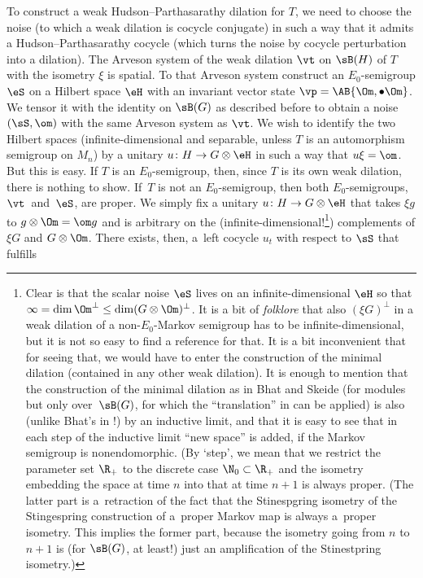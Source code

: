 To construct a weak Hudson--Parthasarathy dilation for $T$, we need to choose the noise (to which a weak dilation is cocycle conjugate) in such a way that it admits a Hudson--Parthasarathy cocycle (which turns the noise by cocycle perturbation into a dilation). The Arveson system of the weak dilation $\vt$ on $\sB(H)$ of $T$ with the isometry $\xi$ is spatial. To that Arveson system construct an $E_0$-semigroup $\eS$ on a Hilbert space $\eH$ with an invariant vector state $\vp=\AB{\Om,\bullet\Om}$. We tensor it with the identity on $\sB(G)$ as described before to obtain a noise $(\sS,\om)$ with the same Arveson system as $\vt$. We wish to identify the two Hilbert spaces (infinite-dimensional and separable, unless $T$ is an automorphism semigroup on $M_n$) by a unitary $u\colon H\rightarrow G\otimes\eH$ in such a way that $u\xi=\om$. But this is easy. If $T$ is an $E_0$-semigroup, then, since $T$ is its own weak dilation, there is nothing to show. If~$T$ is not an $E_0$-semigroup, then both $E_0$-semigroups, $\vt$~and~$\eS$, are proper. We simply fix a unitary $u\colon H\rightarrow G\otimes\eH$ that takes $\xi g$ to $g\otimes\Om=\om g$ and is arbitrary on the (infinite-dimensional!\footnote{Clear is that the scalar noise $\eS$ lives on an infinite-dimensional $\eH$ so that $\infty=\dim\Om^\perp\le\dim(G\otimes\Om)^\perp$. It is a bit of {\it folklore} that also $(\xi G)^\perp$ in a weak dilation of a non-$E_0$-Markov semigroup has to be infinite-dimensional, but it is not so easy to find a reference for that. It is a bit inconvenient that for seeing that, we would have to enter the construction of the minimal dilation (contained in any other weak dilation). It is enough to mention that the construction of the minimal dilation as in Bhat and Skeide \cite[Section 5]{BhSk00} (for modules but only over~$\sB(G)$, for which the ``translation'' in \cite[Section 13]{BhSk00} can be applied) is also (unlike Bhat's in \cite{Bha96}!) by an inductive limit, and that it is easy to see that in each step of the inductive limit ``new space'' is added, if the Markov semigroup is nonendomorphic. (By `step', we mean that we restrict the parameter set $\R_+$ to the discrete case $\N_0\subset\R_+$ and the isometry embedding the space at time $n$ into that at time $n+1$ is always proper. (The latter part is a~retraction of the fact that the Stinespgring isometry of the Stingespring construction of a~proper Markov map is always a~proper isometry. This implies the former part, because the isometry going from $n$ to $n+1$ is (for $\sB(G)$, at least!) just an amplification of the Stinestpring isometry.)}) complements of $\xi G$ and $G\otimes\Om$. There exists, then, a~left cocycle $u_t$ with respect to $\sS$ that fulfills
